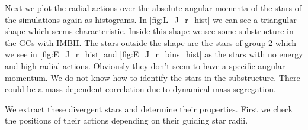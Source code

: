 \par Next we plot the radial actions over the absolute angular momenta of the stars of the simulations again as histograms. In \ref{fig:L_J_r_hist} we can see a triangular shape which seems characteristic. Inside this shape we see some substructure in the \acp{GC} with \ac{IMBH}. The stars outside the shape are the stars of group 2 which we see in \ref{fig:E_J_r_hist} and \ref{fig:E_J_r_bins_hist} as the stars with no energy and high radial actions. Obviously they don't seem to have a specific angular momentum. We do not know how to identify the stars in the substructure. There could be a mass-dependent correlation due to dynamical mass segregation.

\par We extract these divergent stars and determine their properties. First we check the positions of their actions depending on their guiding star radii.
